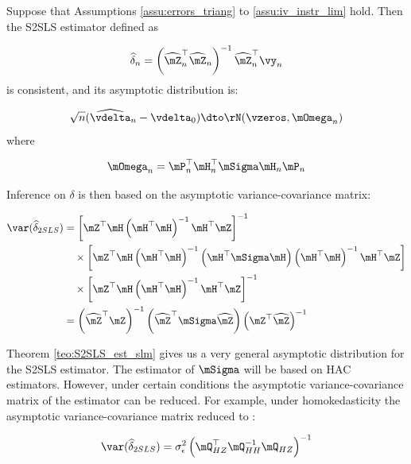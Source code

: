 \documentclass[english,12pt]{book}\usepackage[]{graphicx}\usepackage[]{xcolor}
\begin{document}
\begin{theorem}\label{teo:S2SLS_est_slm}
  Suppose that Assumptions \ref{assu:errors_triang} to \ref{assu:iv_instr_lim} hold. Then the S2SLS estimator defined as
  
  \begin{equation}
    \widehat{\delta}_n = \left(\widehat{\mZ}_n^\top\widehat{\mZ}_n\right)^{-1}\widehat{\mZ}_n^\top\vy_n
  \end{equation}
%
is consistent, and its asymptotic distribution is:

\begin{equation}
\sqrt{n}(\widehat{\vdelta}_{n} - \vdelta_0) \dto \rN(\vzeros, \mOmega_n)
\end{equation}
%
where

\begin{equation}
\mOmega_n =  \mP^\top_n\mH^\top_n\mSigma\mH_n\mP_n
\end{equation}

Inference on $\delta$ is then based on the asymptotic variance-covariance matrix:

\begin{equation}
\begin{aligned}
\var(\widehat{\delta}_{2SLS}) & = \left[\mZ^\top\mH\left(\mH^\top\mH\right)^{-1}\mH^\top\mZ\right]^{-1} \\
                              &  \quad \times \left[\mZ^\top\mH\left(\mH^\top\mH\right)^{-1}\left(\mH^\top\mSigma\mH\right)\left(\mH^\top\mH\right)^{-1}\mH^\top\mZ\right] \\
                              &\quad \times \left[\mZ^\top\mH\left(\mH^\top\mH\right)^{-1}\mH^\top\mZ\right]^{-1} \\
& = \left(\widehat{\mZ}^\top\mZ\right)^{-1}\left(\widehat{\mZ}^\top\mSigma\widehat{\mZ}\right)\left(\mZ^\top\widehat{\mZ}\right)^{-1}
\end{aligned}
\end{equation}
\end{theorem}


Theorem \ref{teo:S2SLS_est_slm} gives us a very general asymptotic distribution for the S2SLS estimator. The estimator of $\mSigma$ will be based on HAC estimators. However, under certain conditions the asymptotic variance-covariance matrix of the estimator can be reduced. For example, under homokedasticity the asymptotic variance-covariance matrix reduced to :

\begin{equation}
\var(\widehat{\delta}_{2SLS}) = \sigma^2_{\epsilon}\left(\mQ_{HZ}^\top\mQ_{HH}^{-1}\mQ_{HZ}\right)^{-1}
\end{equation}
\end{document}
